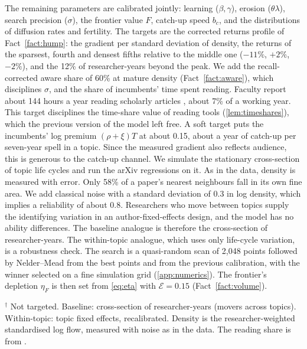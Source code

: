 The remaining parameters are calibrated jointly: learning ($\beta,\gamma$),
erosion ($\theta\lambda$), search precision ($\sigma$), the frontier value $F$,
catch-up speed $b_c$, and the distributions of diffusion rates and fertility.
The targets are the corrected returns profile of Fact~\ref{fact:hump}: the
gradient per standard deviation of density, the returns of the sparsest,
fourth and densest fifths relative to the middle one ($-11\%$, $+2\%$, $-2\%$),
and the 12\% of researcher-years beyond the peak. We add the recall-corrected
aware share of 60\% at mature density (Fact~\ref{fact:aware}), which
disciplines $\sigma$, and the share of incumbents' time spent reading. Faculty
report about 144 hours a year reading scholarly articles
\citep{tenopirking2008}, about 7\% of a working year. This target disciplines
the time-share value of reading tools (\cref{lem:timeshares}), which the
previous version of the model left free. A soft target puts the incumbents'
log premium $(\rho+\xi)T$ at about 0.15, about a year of catch-up per
seven-year spell in a topic. Since the measured gradient also reflects
audience, this is generous to the catch-up channel. We simulate the stationary
cross-section of topic life cycles and run the arXiv regressions on it. As in
the data, density is measured with error. Only 58\% of a paper's nearest
neighbours fall in its own fine area. We add classical noise with a standard
deviation of 0.3 in log density, which implies a reliability of about 0.8.
Researchers who move between topics supply the identifying variation in an
author-fixed-effects design, and the model has no ability differences. The
baseline analogue is therefore the cross-section of researcher-years. The
within-topic analogue, which uses only life-cycle variation, is a robustness
check. The search is a quasi-random scan of 2,048 points followed by
Nelder--Mead from the best points and from the previous calibration, with the
winner selected on a fine simulation grid (\cref{app:numerics}). The frontier's
depletion $\eta_F$ is then set from \eqref{eq:eta} with $\mathcal E=0.15$
(Fact~\ref{fact:volume}).

\begin{table}[t]
\centering\small
\caption{Parameters}\label{tab:calibration}

\end{table}

\begin{table}[t]
\centering\small
\caption{Fit to the arXiv facts}\label{tab:fit}

\par\smallskip\footnotesize
$^\dagger$ Not targeted. Baseline: cross-section of researcher-years (movers
across topics). Within-topic: topic fixed effects, recalibrated. Density is the
researcher-weighted standardised log flow, measured with noise as in the data.
The reading share is from \citet{tenopirking2008}.
\end{table}

